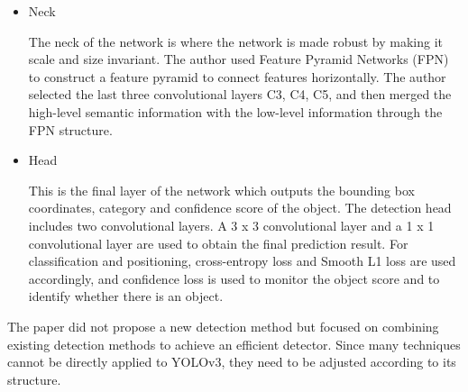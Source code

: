 \documentclass[sensors,article,submit,moreauthors,pdftex]{Definitions/mdpi}
\begin{document}
\begin{itemize}
\item{Neck}

The neck of the network is where the network is made robust by making it scale and size invariant. The author used Feature Pyramid Networks (FPN) to construct a feature pyramid to connect features horizontally. The author selected the last three convolutional layers C3, C4, C5, and then merged the high-level semantic information with the low-level information through the FPN structure.

\end{itemize}


\begin{itemize}

\item{Head}

This is the final layer of the network which outputs the bounding box coordinates, category and confidence score of the object. The detection head includes two convolutional layers. A 3 x 3 convolutional layer and a 1 x 1 convolutional layer are used to obtain the final prediction result. For classification and positioning, cross-entropy loss and Smooth L1 loss are used accordingly, and confidence loss is used to monitor the object score and to identify whether there is an object.
\end{itemize}

The paper did not propose a new detection method but focused on combining existing detection methods to achieve an efficient detector. Since many techniques cannot be directly applied to YOLOv3, they need to be adjusted according to its structure.
\end{document}
